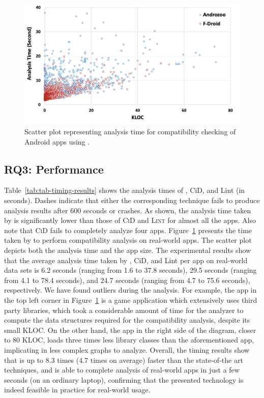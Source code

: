 \begin{figure}[b]
    \centering
    \includegraphics[width=\linewidth]{images/scatterplot.png}
    \caption{Scatter plot representing analysis time for compatibility checking of Android apps using \@approach.}
    \label{fig:scatterplot}
\end{figure}


\subsection{RQ3: Performance} %

Table~\ref{tab:tab-timing-results} shows the analysis
times of \@approach, {\sc CiD}, and {\sc Lint} (in
seconds).  Dashes indicate that either the
corresponding technique fails to produce analysis
results after 600 seconds or crashes.
As shown, the analysis time taken by \@approach is
significantly lower than those of \textsc{CiD} and
\textsc{Lint} for almost all the apps. Also note that
\textsc{CiD} fails to completely analyze four apps.
Figure~\ref{fig:scatterplot} presents the time taken by
\@approach to perform compatibility analysis on
real-world apps.  The scatter plot depicts both the
analysis time and the app size.  The experimental
results show that the average analysis time taken by
\@approach, {\sc CiD}, and {\sc Lint} per app on
real-world data sets is 6.2 seconds (ranging from 1.6
to 37.8 seconds), 29.5 seconds (ranging from 4.1 to
78.4 seconds), and 24.7 seconds (ranging from 4.7 to
75.6 seconds), respectively. We have found outliers
during the analysis. For example, the app in the top
left corner in Figure~\ref{fig:scatterplot} is a game
application which extensively uses third party
libraries, which took a considerable amount of time for
the analyzer to compute the data structures required
for the compatibility analysis, despite its small KLOC.
On the other hand, the app in the right side of the
diagram, closer to 80 KLOC, loads three times less
library classes than the aforementioned app,
implicating in less complex graphs to analyze.
Overall, the timing results show that \@approach  is up
to 8.3 times (4.7 times on average) faster than the
state-of-the art techniques, and is able to complete
analysis of real-world apps in just a few seconds (on
an ordinary laptop), confirming that the presented
technology is indeed feasible in practice for
real-world usage.


